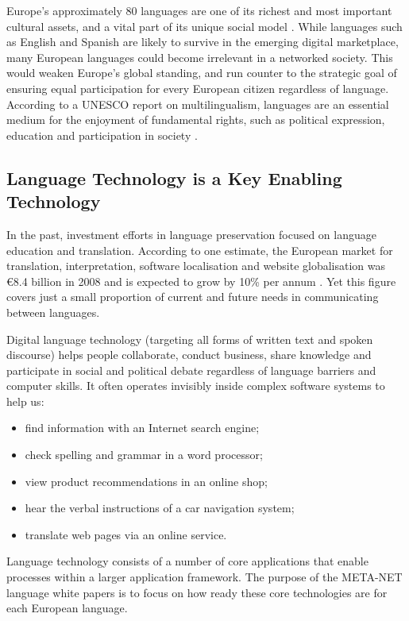 \begin{multicols}{2}
    Europe’s approximately 80 languages are one of its richest and most important cultural assets, and a vital part of its unique social model \cite{CAT-Nota2}. While languages such as English and Spanish are likely to survive in the emerging digital marketplace, many European languages could become irrelevant in a networked society. This would weaken Europe’s global standing, and run counter to the strategic goal of ensuring equal participation for every European citizen regardless of language. According to a UNESCO report on multilingualism, languages are an essential medium for the enjoyment of fundamental rights, such as political expression, education and participation in society \cite{CAT-Nota3}.

\subsection{Language Technology is a Key Enabling Technology}

    In the past, investment efforts in language preservation focused on language education and translation. According to one estimate, the European market for translation, interpretation, software localisation and website globalisation was €8.4 billion in 2008 and is expected to grow by 10\% per annum \cite{CAT-Nota4}. Yet this figure covers just a small proportion of current and future needs in communicating between languages. 

    Digital language technology (targeting all forms of written text and spoken discourse) helps people collaborate, conduct business, share knowledge and participate in social and political debate regardless of language barriers and computer skills. It often operates invisibly inside complex software systems to help us:
    \begin{itemize}
      \item find information with an Internet search engine;
      \item check spelling and grammar in a word processor;
      \item view product recommendations in an online shop;
      \item hear the verbal instructions of a car navigation system;
      \item translate web pages via an online service.
    \end{itemize}
    Language technology consists of a number of core applications that enable processes within a larger application framework. The purpose of the META-NET language white papers is to focus on how ready these core technologies are for each European language. 


\end{multicols}
